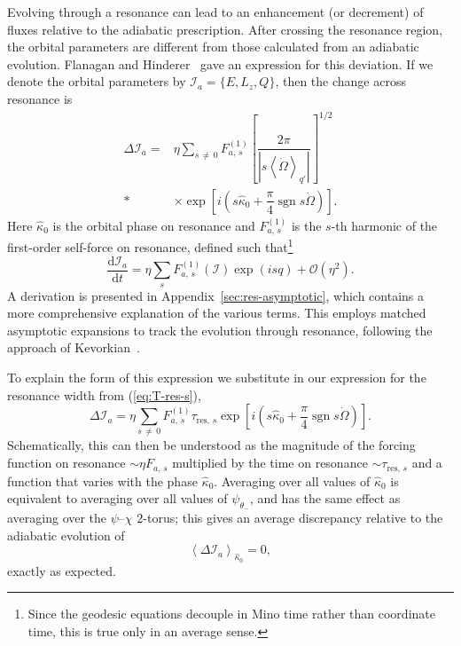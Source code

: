 \documentclass[aps,prd,amsfonts,amssymb,amsmath,nofootinbib,showpacs,superscriptaddress,twocolumn]{revtex4}
\newcommand{\eqnref}[1]{(\ref{eq:#1})}
\newcommand{\apref}[1]{Appendix~\ref{sec:#1}}
\newcommand{\dd}{\ensuremath{\mathrm{d}}}
\newcommand{\diff}[2]{\ensuremath{\dfrac{\dd {#1}}{\dd {#2}}}}
\newcommand{\order}[1]{\ensuremath{\mathcal{O}({#1})}}
\DeclareMathOperator{\sgn}{sgn}
\begin{document}
Evolving through a resonance can lead to an enhancement (or decrement) of fluxes relative to the adiabatic prescription. After crossing the resonance region, the orbital parameters are different from those calculated from an adiabatic evolution. Flanagan and Hinderer~\cite{Flanagan2012} gave an expression for this deviation. If we denote the orbital parameters by $\mathcal{I}_a = \{E,L_z,Q\}$, then the change across resonance is
\begin{align}
\Delta \mathcal{I}_a = {} & \eta\sum_{s\,\neq\,0}F_{a,\,s}^{(1)}\left[\dfrac{2\pi}{\left|s \left\langle\dot{\Omega}\right\rangle_{q'}\right|}\right]^{1/2} \nonumber \\*
 {} & \times {} \exp\left[i\left(s \widehat{\kappa}_0 + \dfrac{\pi}{4} \sgn s\dot{\Omega}\right)\right]. 
\end{align}
Here $\widehat{\kappa}_0$ is the orbital phase on resonance and $F_{a,\,s}^{(1)}$ is the $s$-th harmonic of the first-order self-force on resonance, defined such that\footnote{Since the geodesic equations decouple in Mino time rather than coordinate time, this is true only in an average sense.}
\begin{equation}
\diff{\mathcal{I}_a}{t} = \eta\sum_s F_{a,\,s}^{(1)}(\boldsymbol{\mathcal{I}})\exp(is q) + \order{\eta^2}.
\end{equation}
A derivation is presented in \apref{res-asymptotic}, which contains a more comprehensive explanation of the various terms. This employs matched asymptotic expansions to track the evolution through resonance, following the approach of Kevorkian~\cite{Kevorkian1987}.

To explain the form of this expression we substitute in our expression for the resonance width from \eqnref{T-res-s},
\begin{equation}
\label{eq:delta-I-a}
\Delta \mathcal{I}_a = \eta\sum_{s\,\neq\,0}F_{a,\,s}^{(1)}\tau_{\mathrm{res},\,s}\exp\left[i\left(s \widehat{\kappa}_0 + \dfrac{\pi}{4} \sgn s\dot{\Omega}\right)\right]. 
\end{equation}
Schematically, this can then be understood as the magnitude of the forcing function on resonance $\sim \eta F_{a,\,s}$ multiplied by the time on resonance $\sim \tau_{\mathrm{res},\,s}$ and a function that varies with the phase $\widehat{\kappa}_0$. Averaging over all values of $\widehat{\kappa}_0$ is equivalent to averaging over all values of $\psi_{\theta_-}$, and has the same effect as averaging over the $\psi$--$\chi$ $2$-torus; this gives an average discrepancy relative to the adiabatic evolution of
\begin{equation}
\left\langle \Delta \mathcal{I}_a \right\rangle_{\hat{\kappa}_0} = 0,
\end{equation}
exactly as expected.
\end{document}
